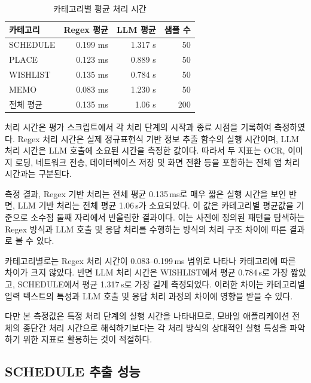 \documentclass[11pt,a4paper]{article}
\begin{document}
\begin{table}[H]
\centering
\small
\begin{tabularx}{0.9\linewidth}{l r r r}
\toprule
\textbf{카테고리} & \textbf{Regex 평균} & \textbf{LLM 평균} & \textbf{샘플 수}\\
\midrule
SCHEDULE & 0.199 ms & 1.317 s & 50\\
PLACE & 0.123 ms & 0.889 s & 50\\
WISHLIST & 0.135 ms & 0.784 s & 50\\
MEMO & 0.083 ms & 1.230 s & 50\\
\midrule
전체 평균 & 0.135 ms & 1.06 s & 200\\
\bottomrule
\end{tabularx}
\caption{카테고리별 평균 처리 시간}
\end{table}

처리 시간은 평가 스크립트에서 각 처리 단계의 시작과 종료 시점을 기록하여 측정하였다. Regex 처리 시간은 실제 정규표현식 기반 정보 추출 함수의 실행 시간이며, LLM 처리 시간은 LLM 호출에 소요된 시간을 측정한 값이다. 따라서 두 지표는 OCR, 이미지 로딩, 네트워크 전송, 데이터베이스 저장 및 화면 전환 등을 포함하는 전체 앱 처리 시간과는 구분된다.

측정 결과, Regex 기반 처리는 전체 평균 0.135\,ms로 매우 짧은 실행 시간을 보인 반면, LLM 기반 처리는 전체 평균 1.06\,s가 소요되었다. 이 값은 카테고리별 평균값을 기준으로 소수점 둘째 자리에서 반올림한 결과이다. 이는 사전에 정의된 패턴을 탐색하는 Regex 방식과 LLM 호출 및 응답 처리를 수행하는 방식의 처리 구조 차이에 따른 결과로 볼 수 있다.

카테고리별로는 Regex 처리 시간이 0.083--0.199\,ms 범위로 나타나 카테고리에 따른 차이가 크지 않았다. 반면 LLM 처리 시간은 WISHLIST에서 평균 0.784\,s로 가장 짧았고, SCHEDULE에서 평균 1.317\,s로 가장 길게 측정되었다. 이러한 차이는 카테고리별 입력 텍스트의 특성과 LLM 호출 및 응답 처리 과정의 차이에 영향을 받을 수 있다.

다만 본 측정값은 특정 처리 단계의 실행 시간을 나타내므로, 모바일 애플리케이션 전체의 종단간 처리 시간으로 해석하기보다는 각 처리 방식의 상대적인 실행 특성을 파악하기 위한 지표로 활용하는 것이 적절하다.

\subsection{SCHEDULE 추출 성능}
\end{document}
